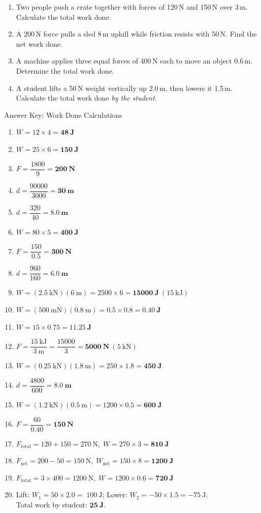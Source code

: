\documentclass[12pt]{article}
\begin{document}
\begin{enumerate}
\item Two people push a crate together with forces of 120\,N and 150\,N over 3\,m. Calculate the total work done.
\item A 200\,N force pulls a sled 8\,m uphill while friction resists with 50\,N. Find the net work done.
\item A machine applies three equal forces of 400\,N each to move an object 0.6\,m. Determine the total work done.
\item A student lifts a 50\,N weight vertically up 2.0\,m, then lowers it 1.5\,m. Calculate the total work done \emph{by the student}.
\end{enumerate}
\newpage
\begin{center}
{\LARGE Answer Key: Work Done Calculations}
\end{center}
\vspace{0.5em}

\begin{enumerate}
\item $W = 12\times 4 = \mathbf{48~J}$
\item $W = 25\times 6 = \mathbf{150~J}$
\item $F = \dfrac{1800}{9} = \mathbf{200~N}$
\item $d = \dfrac{90000}{3000} = \mathbf{30~m}$
\item $d = \dfrac{320}{40} = \mathbf{8.0~m}$
\item $W = 80\times 5 = \mathbf{400~J}$
\item $F = \dfrac{150}{0.5} = \mathbf{300~N}$
\item $d = \dfrac{960}{160} = \mathbf{6.0~m}$

\item $W = (2.5~\text{kN})(6~\text{m}) = 2500\times 6 = \mathbf{15000~J}~(15~\text{kJ})$
\item $W = (500~\text{mN})(0.8~\text{m}) = 0.5\times 0.8 = \mathbf{0.40~J}$
\item $W = 15\times 0.75 = \mathbf{11.25~J}$
\item $F = \dfrac{15~\text{kJ}}{3~\text{m}} = \dfrac{15000}{3} = \mathbf{5000~N}~(5~\text{kN})$
\item $W = (0.25~\text{kN})(1.8~\text{m}) = 250\times 1.8 = \mathbf{450~J}$
\item $d = \dfrac{4800}{600} = \mathbf{8.0~m}$
\item $W = (1.2~\text{kN})(0.5~\text{m}) = 1200\times 0.5 = \mathbf{600~J}$
\item $F = \dfrac{60}{0.40} = \mathbf{150~N}$

\item $F_{\text{total}} = 120+150=270~\text{N},\; W = 270\times 3 = \mathbf{810~J}$
\item $F_{\text{net}} = 200-50=150~\text{N},\; W_{\text{net}} = 150\times 8 = \mathbf{1200~J}$
\item $F_{\text{total}} = 3\times 400=1200~\text{N},\; W = 1200\times 0.6 = \mathbf{720~J}$
\item Lift: $W_1=50\times 2.0=\;100~\text{J}$; Lower: $W_2=-50\times 1.5=-75~\text{J}$;\\
Total work by student: $\mathbf{25~J}$.
\end{enumerate}
\end{document}
